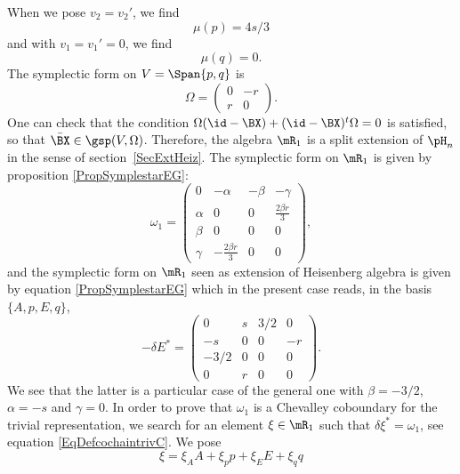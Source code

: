 When we pose $v_2=v_2'$, we find
\begin{equation}
	\mu(p)=4s/3
\end{equation}
and with $v_1=v_1'=0$, we find
\begin{equation}
	\mu(q)=0.
\end{equation}
The symplectic form on $V=\Span\{ p,q \}$ is
\begin{equation}
	\Omega=\begin{pmatrix}
		0 & -r \\
		r & 0
	\end{pmatrix}.
\end{equation}
One can check that the condition $\Omega(\id-\BX)+(\id-\BX)^{t}\Omega=0$ is satisfied, so that $\bar{\BX}\in\gsp(V,\Omega)$. Therefore, the algebra $\mR_{1}$ is a split extension of $\pH_{n}$ in the sense of section~\ref{SecExtHeiz}. The symplectic form on $\mR_1$ is given by proposition \eqref{PropSymplestarEG}:
\begin{equation}
	\omega_{1}=\begin{pmatrix}
		0      & -\alpha                 & -\beta & -\gamma                \\
		\alpha & 0                       & 0      & \frac{ 2\beta r }{ 3 } \\
		\beta  & 0                       & 0      & 0                      \\
		\gamma & -\frac{ 2\beta r }{ 3 } & 0      & 0
	\end{pmatrix},
\end{equation}
and the symplectic form on $\mR_1$ seen as extension of Heisenberg algebra is given by equation \eqref{PropSymplestarEG} which in the present case reads, in the basis $\{ A,p,E,q \}$,
\begin{equation}
	-\delta E^*=
	\begin{pmatrix}
		0    & s & 3/2 & 0  \\
		-s   & 0 & 0   & -r \\
		-3/2 & 0 & 0   & 0  \\
		0    & r & 0   & 0
	\end{pmatrix}.
\end{equation}
We see that the latter is a particular case of the general one with $\beta=-3/2$, $\alpha=-s$ and $\gamma=0$. In order to prove that $\omega_{1}$ is a Chevalley coboundary for the trivial representation, we search for an element $\xi\in\mR_1$ such that $\delta\xi^*=\omega_{1}$, see equation \eqref{EqDefcochaintrivC}. We pose
\[
	\xi=\xi_{A}A+\xi_{p}p+\xi_{E}E+\xi_{q}q
\]

